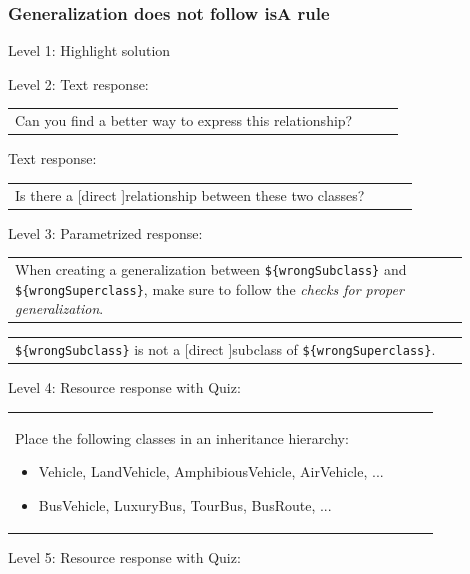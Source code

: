 \subsubsection{Generalization does not follow isA rule}

\noindent Level 1: Highlight solution \medskip

\noindent Level 2: Text response: \medskip

\begin{tabular}{|p{0.9\linewidth}}
Can you find a better way to express this relationship?
\end{tabular} \medskip

Text response: \medskip

\begin{tabular}{|p{0.9\linewidth}}
Is there a [direct ]relationship between these two classes?
\end{tabular} \medskip

\noindent Level 3: Parametrized response: \medskip

\begin{tabular}{|p{0.9\linewidth}}
When creating a generalization between \verb|${wrongSubclass}| and \verb|${wrongSuperclass}|, make sure to follow the \textit{checks for proper generalization}.
\end{tabular} \medskip

\begin{tabular}{|p{0.9\linewidth}}
\verb|${wrongSubclass}| is not a [direct ]subclass of \verb|${wrongSuperclass}|.
\end{tabular} \medskip

\noindent Level 4: Resource response with Quiz: \medskip

\begin{tabular}{|p{0.9\linewidth}}
Place the following classes in an inheritance hierarchy:

\begin{itemize}
    \item Vehicle, LandVehicle, AmphibiousVehicle, AirVehicle, ...
    \item BusVehicle, LuxuryBus, TourBus, BusRoute, ...
\end{itemize}

\end{tabular} \medskip

\noindent Level 5: Resource response with Quiz: \medskip

